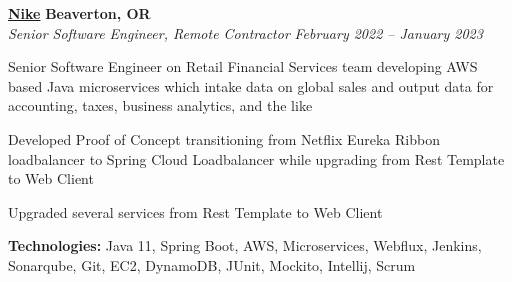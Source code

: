 %
    \headerrow
        {\textbf{\href{https://www.nike.com/}{Nike}}}
        {\textbf{Beaverton, OR}}
    \\
    \headerrow
        {\emph{Senior Software Engineer, Remote Contractor}}
        {\emph{February 2022 -- January 2023}}
    \begin{itemize*}
        \item Senior Software Engineer on Retail Financial Services team developing AWS based Java microservices which intake data on global sales and output data for accounting, taxes, business analytics, and the like
        \item Developed Proof of Concept transitioning from Netflix Eureka Ribbon loadbalancer to Spring Cloud Loadbalancer while upgrading from Rest Template to Web Client
        \item Upgraded several services from Rest Template to Web Client
    \end{itemize*}

    \hspace{1.0em}
        {\textbf{Technologies:} Java 11, Spring Boot, AWS, Microservices, Webflux, Jenkins, Sonarqube, Git, EC2, DynamoDB, JUnit, Mockito, Intellij, Scrum}

